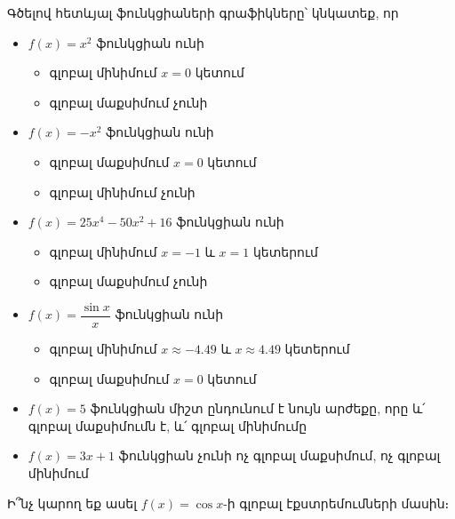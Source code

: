\begin{example}\label{extrema_example}
Գծելով հետևյալ ֆունկցիաների գրաֆիկները՝ կնկատեք, որ
\begin{itemize}
    \item $f(x)=x^2$ ֆունկցիան ունի 
    \begin{itemize}
        \item[-] գլոբալ մինիմում $x=0$ կետում
        \item[-] գլոբալ մաքսիմում չունի
    \end{itemize}
    
    \item $f(x)=-x^2$ ֆունկցիան ունի
    \begin{itemize}
        \item[-] գլոբալ մաքսիմում $x=0$ կետում
        \item[-] գլոբալ մինիմում չունի    
    \end{itemize}
    
    \item $f(x)=25x^4 - 50x^2 + 16$ ֆունկցիան ունի
    \begin{itemize}
        \item[-] գլոբալ մինիմում $x=-1$ և $x=1$ կետերում
        \item[-] գլոբալ մաքսիմում չունի
    \end{itemize}
        
    \item $f(x)=\dfrac{\sin{x}}{x}$ ֆունկցիան ունի
    \begin{itemize}
        \item[-] գլոբալ մինիմում $x \approx -4.49$ և $x \approx 4.49$ կետերում
        \item[-] գլոբալ մաքսիմում $x=0$ կետում
    \end{itemize}
    
    
    \item $f(x)=5$ ֆունկցիան միշտ ընդունում է նույն արժեքը, որը և՛ գլոբալ մաքսիմումն է, և՛ գլոբալ մինիմումը
    
    \item $f(x)=3x+1$ ֆունկցիան չունի ոչ գլոբալ մաքսիմում, ոչ գլոբալ մինիմում
\end{itemize}

Ի՞նչ կարող եք ասել $f(x)=\cos x$-ի գլոբալ էքստրեմումների մասին։
\end{example}

